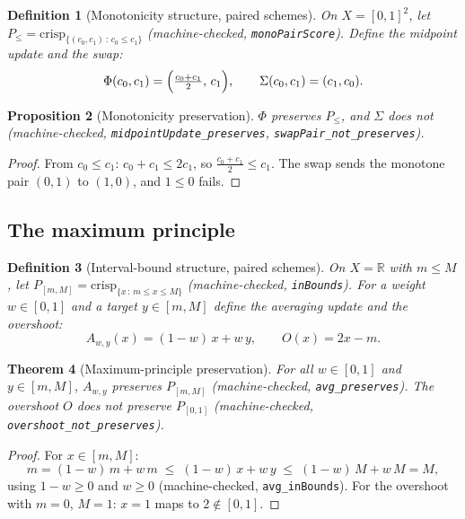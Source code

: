\documentclass[11pt,a4paper]{article}
\newtheorem{theorem}{Theorem}[section]
\newtheorem{proposition}[theorem]{Proposition}
\newtheorem{definition}[theorem]{Definition}
\newcommand{\Real}{\mathbb{R}}
\begin{document}
\begin{definition}[Monotonicity structure, paired schemes]
\label{def:mono}
On $X = [0,1]^2$, let
$P_{\le} = \mathrm{crisp}_{\{(c_0, c_1) \,:\, c_0 \le c_1\}}$
(machine-checked, \texttt{monoPairScore}).
Define the midpoint update and the swap:
\[
  \Phi(c_0, c_1) = \Bigl(\tfrac{c_0 + c_1}{2},\, c_1\Bigr),
  \qquad
  \Sigma(c_0, c_1) = (c_1, c_0).
\]
\end{definition}

\begin{proposition}[Monotonicity preservation]
\label{thm:mono}
$\Phi$ preserves $P_{\le}$, and $\Sigma$ does not
(machine-checked, \texttt{midpointUpdate\_preserves},
\texttt{swapPair\_not\_preserves}).
\end{proposition}
\begin{proof}
From $c_0 \le c_1$: $c_0 + c_1 \le 2 c_1$, so
$\tfrac{c_0 + c_1}{2} \le c_1$.
The swap sends the monotone pair $(0,1)$ to $(1,0)$, and
$1 \le 0$ fails.
\end{proof}

\subsection{The maximum principle}

\begin{definition}[Interval-bound structure, paired schemes]
\label{def:maxprin}
On $X = \Real$ with $m \le M$, let
$P_{[m,M]} = \mathrm{crisp}_{\{x \,:\, m \le x \le M\}}$
(machine-checked, \texttt{inBounds}).
For a weight $w \in [0,1]$ and a target $y \in [m, M]$ define the
averaging update and the overshoot:
\[
  A_{w,y}(x) = (1 - w)\,x + w\,y,
  \qquad
  O(x) = 2x - m .
\]
\end{definition}

\begin{theorem}[Maximum-principle preservation]
\label{thm:maxprin}
For all $w \in [0,1]$ and $y \in [m,M]$, $A_{w,y}$ preserves
$P_{[m,M]}$
(machine-checked, \texttt{avg\_preserves}).
The overshoot $O$ does not preserve $P_{[0,1]}$
(machine-checked, \texttt{overshoot\_not\_preserves}).
\end{theorem}
\begin{proof}
For $x \in [m,M]$:
\[
  m = (1-w)\,m + w\,m \;\le\; (1-w)\,x + w\,y \;\le\; (1-w)\,M + w\,M = M,
\]
using $1 - w \ge 0$ and $w \ge 0$
(machine-checked, \texttt{avg\_inBounds}).
For the overshoot with $m = 0$, $M = 1$: $x = 1$ maps to $2 \notin
[0,1]$.
\end{proof}
\end{document}
